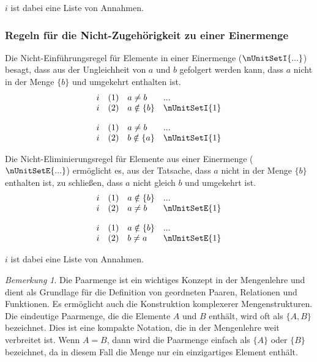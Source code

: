 \documentclass{book}
\theoremstyle{plain}
\theoremstyle{remark}
\newtheorem*{remark}{Bemerkung}
\theoremstyle{definition}
\begin{document}
\(i\) ist dabei eine Liste von Annahmen.

\subsubsection{Regeln für die Nicht-Zugehörigkeit zu einer Einermenge}
\label{rule:nUnitSetI} \label{rule:nUnitSetE}

Die Nicht-Einführungsregel für Elemente in einer Einermenge (\(\nUnitSetI{...}\)) besagt, dass aus der Ungleichheit von \(a\) und \(b\) gefolgert werden kann, dass \(a\) nicht in der Menge \(\{b\}\) und umgekehrt enthalten ist.
\[
\begin{array}{llll}
	i & (1) & a \neq b & ... \\
	i & (2) & a \notin \{b\} & \nUnitSetI{1} \\
\end{array}
\]

\[
\begin{array}{llll}
	i & (1) & a \neq b & ... \\
	i & (2) & b \notin \{a\} & \nUnitSetI{1} \\
\end{array}
\]

Die Nicht-Eliminierungsregel für Elemente aus einer Einermenge (\(\nUnitSetE{...}\)) ermöglicht es, aus der Tatsache, dass \(a\) nicht in der Menge \(\{b\}\) enthalten ist, zu schließen, dass \(a\) nicht gleich \(b\) und umgekehrt ist.
\[
\begin{array}{llll}
	i & (1) & a \notin \{b\} & ... \\
	i & (2) & a \neq b & \nUnitSetE{1} \\
\end{array}
\]

\[
\begin{array}{llll}
	i & (1) & a \notin \{b\} & ... \\
	i & (2) & b \neq a & \nUnitSetE{1} \\
\end{array}
\]


\(i\) ist dabei eine Liste von Annahmen.	

\begin{remark}
	Die Paarmenge ist ein wichtiges Konzept in der Mengenlehre und dient als Grundlage für die Definition von geordneten Paaren, Relationen und Funktionen. Es ermöglicht auch die Konstruktion komplexerer Mengenstrukturen. Die eindeutige Paarmenge, die die Elemente \( A \) und \( B \) enthält, wird oft als \( \{ A, B \} \) bezeichnet. Dies ist eine kompakte Notation, die in der Mengenlehre weit verbreitet ist. Wenn \( A = B \), dann wird die Paarmenge einfach als \( \{ A \} \) oder \( \{ B \} \) bezeichnet, da in diesem Fall die Menge nur ein einzigartiges Element enthält.
\end{remark}
\end{document}
